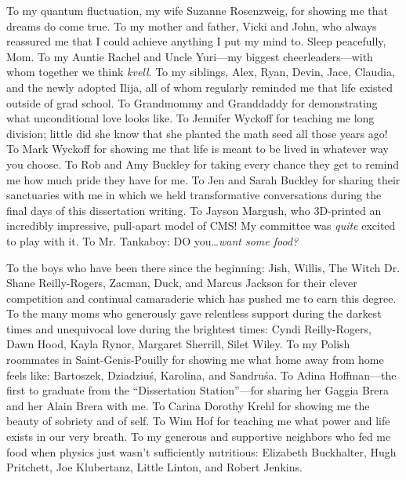 To my quantum fluctuation, my wife Suzanne Rosenzweig, for showing me that dreams do come true.
To my mother and father, Vicki and John, who always reassured me that I could achieve anything I put my mind to. Sleep peacefully, Mom.
To my Auntie Rachel and Uncle Yuri---my biggest cheerleaders---with whom together we think \emph{kvell}.
To my siblings, Alex, Ryan, Devin, Jace, Claudia, and the newly adopted Ilija, all of whom regularly reminded me that life existed outside of grad school.
To Grandmommy and Granddaddy for demonstrating what unconditional love looks like.
To Jennifer Wyckoff for teaching me long division; little did she know that she planted the math seed all those years ago!
To Mark Wyckoff for showing me that life is meant to be lived in whatever way you choose.
To Rob and Amy Buckley for taking every chance they get to remind me how much pride they have for me.
To Jen and Sarah Buckley for sharing their sanctuaries with me in which we held transformative conversations during the final days of this dissertation writing.
To Jayson Margush, who 3D-printed an incredibly impressive, pull-apart model of CMS! My committee was \emph{quite} excited to play with it.
To Mr. Tankaboy: DO you\ldots \emph{want some food?}

To the boys who have been there since the beginning: Jish, Willis, The Witch Dr. Shane Reilly-Rogers, Zacman, Duck, and Marcus Jackson for their clever competition and continual camaraderie which has pushed me to earn this degree.
To the many moms who generously gave relentless support during the darkest times and unequivocal love during the brightest times:
Cyndi Reilly-Rogers, Dawn Hood, Kayla Rynor, Margaret Sherrill, Silet Wiley.
To my Polish roommates in Saint-Genis-Pouilly for showing me what home away from home feels like: Bartoszek, Dziadziuś, Karolina, and Sandruśa.
To Adina Hoffman---the first to graduate from the ``Dissertation Station''---for sharing her Gaggia Brera and her Alain Brera with me.
To Carina Dorothy Krehl for showing me the beauty of sobriety and of self.
To Wim Hof for teaching me what power and life exists in our very breath.
To my generous and supportive neighbors who fed me food when physics just wasn't sufficiently nutritious: Elizabeth Buckhalter, Hugh Pritchett, Joe Klubertanz, Little Linton, and Robert Jenkins.

